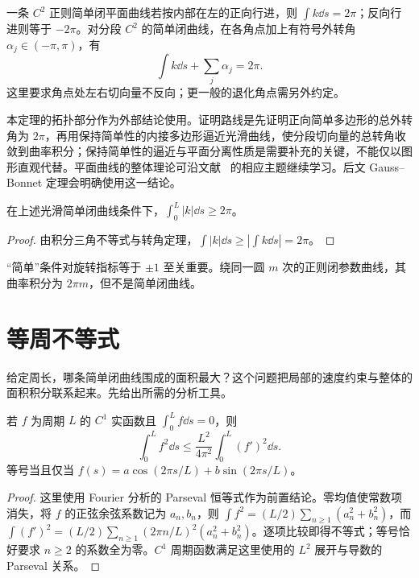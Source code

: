 \begin{theorem}[简单闭曲线的转角定理]
一条 $C^2$ 正则简单闭平面曲线若按内部在左的正向行进，则 $\int k\dd s=2\pi$；反向行进则等于 $-2\pi$。对分段 $C^2$ 的简单闭曲线，在各角点加上有符号外转角 $\alpha_j\in(-\pi,\pi)$，有
\begin{equation}
 \int k\dd s+\sum_j\alpha_j=2\pi.
 \label{eq:dg-turning}
\end{equation}
这里要求角点处左右切向量不反向；更一般的退化角点需另外约定。
\label{thm:dg-turning}
\end{theorem}
本定理的拓扑部分作为外部结论使用。证明路线是先证明正向简单多边形的总外转角为 $2\pi$，再用保持简单性的内接多边形逼近光滑曲线，使分段切向量的总转角收敛到曲率积分；保持简单性的逼近与平面分离性质是需要补充的关键，不能仅以图形直观代替。平面曲线的整体理论可沿文献~\cite{mit-notes,docarmo} 的相应主题继续学习。后文 Gauss--Bonnet 定理会明确使用这一结论。

\begin{corollary}[简单闭曲线的总绝对曲率下界]
在上述光滑简单闭曲线条件下，$\int_0^L|k|\dd s\ge2\pi$。
\end{corollary}
\begin{proof}
由积分三角不等式与转角定理，$\int|k|\dd s\ge|\int k\dd s|=2\pi$。
\end{proof}
“简单”条件对旋转指标等于 $\pm1$ 至关重要。绕同一圆 $m$ 次的正则闭参数曲线，其曲率积分为 $2\pi m$，但不是简单闭曲线。

\section{等周不等式}
给定周长，哪条简单闭曲线围成的面积最大？这个问题把局部的速度约束与整体的面积积分联系起来。先给出所需的分析工具。
\begin{lemma}
若 $f$ 为周期 $L$ 的 $C^1$ 实函数且 $\int_0^Lf\dd s=0$，则
\begin{equation}
 \int_0^L f^2\dd s\le\frac{L^2}{4\pi^2}\int_0^L(f')^2\dd s.
 \label{eq:dg-wirtinger}
\end{equation}
等号当且仅当 $f(s)=a\cos(2\pi s/L)+b\sin(2\pi s/L)$。
\label{lem:dg-wirtinger}
\end{lemma}
\begin{proof}
这里使用 Fourier 分析的 Parseval 恒等式作为前置结论。零均值使常数项消失，将 $f$ 的正弦余弦系数记为 $a_n,b_n$，则 $\int f^2=(L/2)\sum_{n\ge1}(a_n^2+b_n^2)$，而 $\int(f')^2=(L/2)\sum_{n\ge1}(2\pi n/L)^2(a_n^2+b_n^2)$。逐项比较即得不等式；等号恰好要求 $n\ge2$ 的系数全为零。$C^1$ 周期函数满足这里使用的 $L^2$ 展开与导数的 Parseval 关系。
\end{proof}

